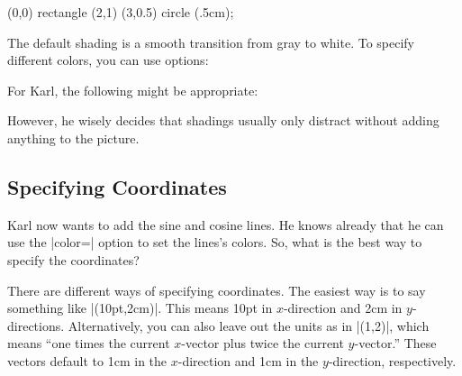 \begin{codeexample}[]
  \tikz \shade (0,0) rectangle (2,1)  (3,0.5) circle (.5cm);
\end{codeexample}
The default shading is a smooth transition from gray to white. To
specify different colors, you can use options:

\begin{codeexample}[]
\end{codeexample}

For Karl, the following might be appropriate:

\begin{codeexample}[]
\end{codeexample}

However, he wisely decides that shadings usually only distract without
adding anything to the picture.


\subsection{Specifying Coordinates}

Karl now wants to add the sine and cosine lines. He knows already that
he can use the |color=| option to set the lines's colors. So, what is
the best way to specify the coordinates?

There are different ways of specifying coordinates. The easiest way is
to say something like |(10pt,2cm)|. This means 10pt in $x$-direction
and 2cm in $y$-directions. Alternatively, you can also leave out the
units as in |(1,2)|, which means ``one times the current $x$-vector
plus twice the current $y$-vector.'' These vectors default to 1cm in
the $x$-direction and 1cm in the $y$-direction, respectively.

